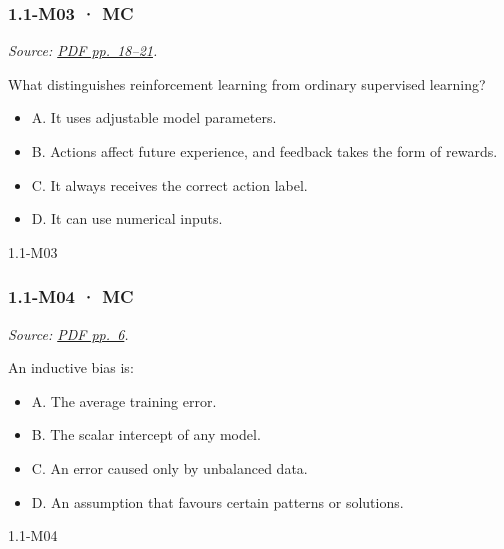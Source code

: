 \noindent\begin{minipage}{\linewidth}

\subsubsection{1.1-M03 · MC}\label{m03-mc}

\emph{Source:
\href{../Lecture\%20Slides/1.1.\%20Fundamentals.pdf\#page=18}{PDF
pp.~18--21}.}

What distinguishes reinforcement learning from ordinary supervised
learning?

\begin{itemize}
\tightlist
\item
  A. It uses adjustable model parameters.
\item
  B. Actions affect future experience, and feedback takes the form of
  rewards.
\item
  C. It always receives the correct action label.
\item
  D. It can use numerical inputs.
\end{itemize}

\begin{solution}[8mm]{1.1-M03}

\end{solution}
\end{minipage}\par\medskip

\noindent\begin{minipage}{\linewidth}

\subsubsection{1.1-M04 · MC}\label{m04-mc}

\emph{Source:
\href{../Lecture\%20Slides/1.1.\%20Fundamentals.pdf\#page=6}{PDF
pp.~6}.}

An inductive bias is:

\begin{itemize}
\tightlist
\item
  A. The average training error.
\item
  B. The scalar intercept of any model.
\item
  C. An error caused only by unbalanced data.
\item
  D. An assumption that favours certain patterns or solutions.
\end{itemize}

\begin{solution}[8mm]{1.1-M04}

\end{solution}
\end{minipage}\par\medskip

